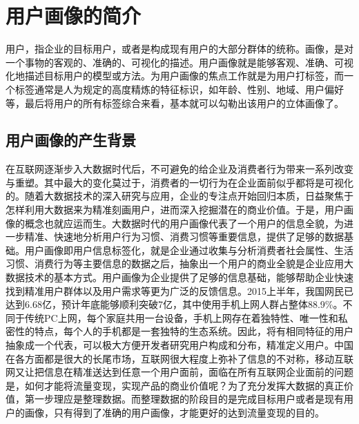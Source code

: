 \section{用户画像的简介}
	用户，指企业的目标用户，或者是构成现有用户的大部分群体的统称。画像，是对一个事物的客观的、准确的、可视化的描述。用户画像就是能够客观、准确、可视化地描述目标用户的模型或方法。为用户画像的焦点工作就是为用户打标签，而一个标签通常是人为规定的高度精炼的特征标识，如年龄、性别、地域、用户偏好等，最后将用户的所有标签综合来看，基本就可以勾勒出该用户的立体画像了。
	\subsection{用户画像的产生背景}
	在互联网逐渐步入大数据时代后，不可避免的给企业及消费者行为带来一系列改变与重塑。其中最大的变化莫过于，消费者的一切行为在企业面前似乎都将是可视化的。随着大数据技术的深入研究与应用，企业的专注点开始回归本质，日益聚焦于怎样利用大数据来为精准刻画用户，进而深入挖掘潜在的商业价值。于是，用户画像的概念也就应运而生。大数据时代的用户画像代表了一个用户的信息全貌，为进一步精准、快速地分析用户行为习惯、消费习惯等重要信息，提供了足够的数据基础。用户画像即用户信息标签化，就是企业通过收集与分析消费者社会属性、生活习惯、消费行为等主要信息的数据之后，抽象出一个用户的商业全貌是企业应用大数据技术的基本方式。用户画像为企业提供了足够的信息基础，能够帮助企业快速找到精准用户群体以及用户需求等更为广泛的反馈信息。2015上半年，我国网民已达到6.68亿，预计年底能够顺利突破7亿，其中使用手机上网人群占整体88.9\%。不同于传统PC上网，每个家庭共用一台设备，手机上网存在着独特性、唯一性和私密性的特点，每个人的手机都是一套独特的生态系统。因此，将有相同特征的用户抽象成一个代表，可以极大方便开发者研究用户构成和分布，精准定义用户。中国在各方面都是很大的长尾市场，互联网很大程度上弥补了信息的不对称，移动互联网又让把信息在精准送达到任意一个用户面前，面临在所有互联网企业面前的问题是，如何才能将流量变现，实现产品的商业价值呢？为了充分发挥大数据的真正价值，第一步理应是整理数据。而整理数据的阶段目的是完成目标用户或者是现有用户的画像，只有得到了准确的用户画像，才能更好的达到流量变现的目的。
